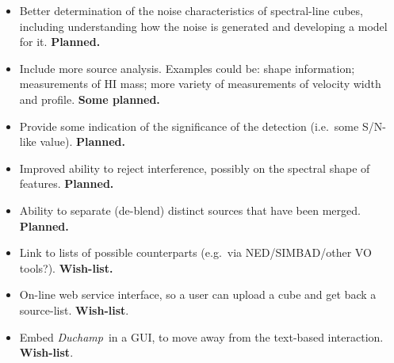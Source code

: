 \documentclass[12pt,a4paper]{article}
\newcommand{\eg}{e.g.\ }
\newcommand{\ie}{i.e.\ }
\newcommand{\duchamp}{\emph{Duchamp}}
\begin{document}
\begin{itemize}

\item Better determination of the noise characteristics of
  spectral-line cubes, including understanding how the noise is
  generated and developing a model for it. \textbf{Planned.}
  
\item Include more source analysis. Examples could be: shape
  information; measurements of HI mass; more variety of measurements
  of velocity width and profile. \textbf{Some planned.}

\item Provide some indication of the significance of the detection
  (\ie some S/N-like value). \textbf{Planned.}

\item Improved ability to reject interference, possibly on the
  spectral shape of features. \textbf{Planned.}

\item Ability to separate (de-blend) distinct sources that have been
  merged. \textbf{Planned.}

\item Link to lists of possible counterparts (\eg via NED/SIMBAD/other
  VO tools?). \textbf{Wish-list.} 

\item On-line web service interface, so a user can upload a cube and
  get back a source-list. \textbf{Wish-list}.

\item Embed \duchamp\ in a GUI, to move away from the text-based
  interaction. \textbf{Wish-list}.
\end{itemize}
\end{document}
